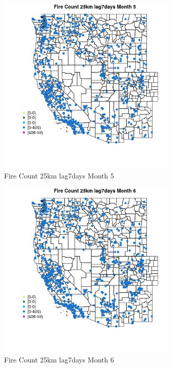 \begin{figure} 
\centering  
\includegraphics[width=0.77\textwidth]{Code_Outputs/Report_ML_input_PM25_Step4_part_f_de_duplicated_aveswNAs_MapObsMo5Fire_Count_25km_lag7days.jpg} 
\caption{\label{fig:Report_ML_input_PM25_Step4_part_f_de_duplicated_aveswNAsMapObsMo5Fire_Count_25km_lag7days}Fire Count 25km lag7days Month 5} 
\end{figure} 
 

\begin{figure} 
\centering  
\includegraphics[width=0.77\textwidth]{Code_Outputs/Report_ML_input_PM25_Step4_part_f_de_duplicated_aveswNAs_MapObsMo6Fire_Count_25km_lag7days.jpg} 
\caption{\label{fig:Report_ML_input_PM25_Step4_part_f_de_duplicated_aveswNAsMapObsMo6Fire_Count_25km_lag7days}Fire Count 25km lag7days Month 6} 
\end{figure} 
 

